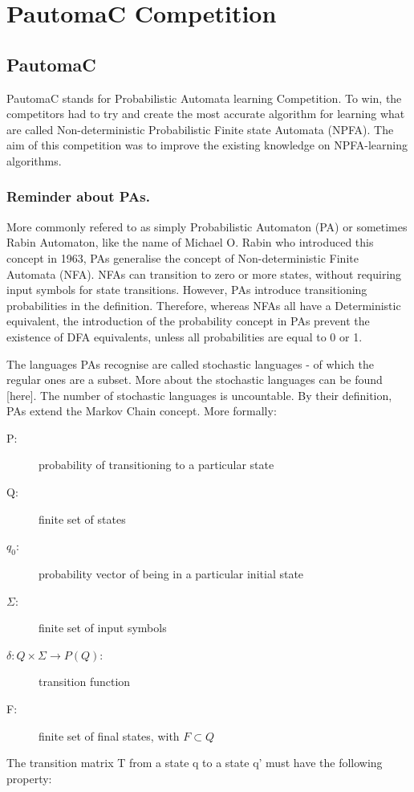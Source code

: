 \section{PautomaC Competition}

\subsection{PautomaC}

\enskip{}\quad{}PautomaC stands for Probabilistic Automata learning
Competition. To win, the competitors had to try and create the most
accurate algorithm for learning what are called Non-deterministic
Probabilistic Finite state Automata (NPFA). The aim of this competition
was to improve the existing knowledge on NPFA-learning algorithms.


\subsubsection{Reminder about PAs.}

\quad{}\enskip{}More commonly refered to as simply Probabilistic
Automaton (PA) or sometimes Rabin Automaton, like the name of Michael
O. Rabin who introduced this concept in 1963, PAs generalise the concept
of Non-deterministic Finite Automata (NFA). NFAs can transition to
zero or more states, without requiring input symbols for state transitions.
However, PAs introduce transitioning probabilities in the definition.
Therefore, whereas NFAs all have a Deterministic equivalent, the introduction
of the probability concept in PAs prevent the existence of DFA equivalents,
unless all probabilities are equal to 0 or 1.

The languages PAs recognise are called stochastic languages - of which
the regular ones are a subset. More about the stochastic languages
can be found {[}here{]}. The number of stochastic languages is uncountable.
By their definition, PAs extend the Markov Chain concept. More formally:
\begin{description}
\item [{P:}] probability of transitioning to a particular state
\item [{Q:}] finite set of states
\item [{$q_{0}$:}] probability vector of being in a particular initial
state
\item [{$\varSigma$:}] finite set of input symbols
\item [{$\delta:Q\times\varSigma\longrightarrow P(Q)$:}] transition function
\item [{F:}] finite set of final states, with $F\subset Q$
\end{description}
The transition matrix T from a state q to a state q' must have the
following property:

